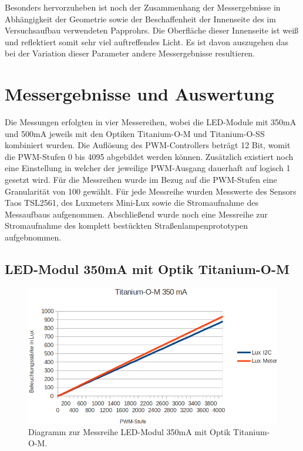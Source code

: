\documentclass[a4paper,12pt]{scrartcl}
\begin{document}
Besonders hervorzuheben ist noch der Zusammenhang der Messergebnisse in Abhängigkeit der Geometrie sowie der Beschaffenheit der Innenseite des im Versuchsaufbau
verwendeten Papprohrs. Die Oberfläche dieser Innenseite ist weiß und reflektiert somit sehr viel auftreffendes Licht. Es ist davon auszugehen das bei der
Variation dieser Parameter andere Messergebnisse resultieren.

\clearpage
\section{Messergebnisse und Auswertung}
\label{sec:auswertung}
Die Messungen erfolgten in vier Messereihen, wobei die LED-Module mit 350mA und 500mA jeweils mit den Optiken Titanium-O-M und Titanium-O-SS kombiniert wurden.
Die Auflösung des PWM-Controllers beträgt 12 Bit, womit die PWM-Stufen 0 bis 4095 abgebildet werden können. Zusätzlich existiert noch eine Einstellung in
welcher der jeweilige PWM-Ausgang dauerhaft auf logisch 1 gesetzt wird. Für die Messreihen wurde im Bezug auf die PWM-Stufen eine Granularität von 100 gewählt.
Für jede Messreihe wurden Messwerte  des Sensors Taos TSL2561, des Luxmeters Mini-Lux sowie die Stromaufnahme des Messaufbaus aufgenommen.
Abschließend wurde noch eine Messreihe zur Stromaufnahme des komplett bestückten Straßenlampenprototypen aufgebnommen.

\subsection{LED-Modul 350mA mit Optik Titanium-O-M}

\begin{figure}[H]
  \begin{center}
    \includegraphics[width=1\hsize]{./images/350-m-print.png}
  \end{center}
\caption[Diagramm zur Messreihe LED-Modul 350mA mit Optik Titanium-O-M]{\label{diagram350matitm}Diagramm zur Messreihe LED-Modul 350mA mit Optik
Titanium-O-M.}
\end{figure}
\end{document}

